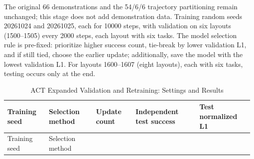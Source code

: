 The original 66 demonstrations and the 54/6/6 trajectory partitioning remain unchanged; this stage does not add demonstration data. Training random seeds 20261024 and 20261025, each for 10000 steps, with validation on six layouts (1500--1505) every 2000 steps, each layout with six tasks. The model selection rule is pre-fixed: prioritize higher success count, tie-break by lower validation L1, and if still tied, choose the earlier update; additionally, save the model with the lowest validation L1. For layouts 1600--1607 (eight layouts), each with six tasks, testing occurs only at the end.


\FloatBarrier\begingroup\small\setlength{\tabcolsep}{2.5pt}
\begin{longtable}[]{@{}
  >{\raggedright\arraybackslash}p{}
  >{\raggedright\arraybackslash}p{}
  >{\raggedright\arraybackslash}p{}
  >{\raggedright\arraybackslash}p{}
  >{\raggedright\arraybackslash}p{}@{}}
\caption{ACT Expanded Validation and Retraining: Settings and Results}\label{tab:s05-10}\tabularnewline
\toprule\noalign{}
\begin{minipage}[b]{\linewidth}\raggedright
Training seed
\end{minipage} & \begin{minipage}[b]{\linewidth}\raggedright
Selection method
\end{minipage} & \begin{minipage}[b]{\linewidth}\raggedright
Update count
\end{minipage} & \begin{minipage}[b]{\linewidth}\raggedright
Independent test success
\end{minipage} & \begin{minipage}[b]{\linewidth}\raggedright
Test normalized L1
\end{minipage} \\
\midrule\noalign{}
\endfirsthead
\toprule\noalign{}
\begin{minipage}[b]{\linewidth}\raggedright
Training seed
\end{minipage} & \begin{minipage}[b]{\linewidth}\raggedright
Selection method
\end{minipage} & \begin{minipage}[b]{\linewidth}\raggedright

\end{minipage}
\end{longtable}
